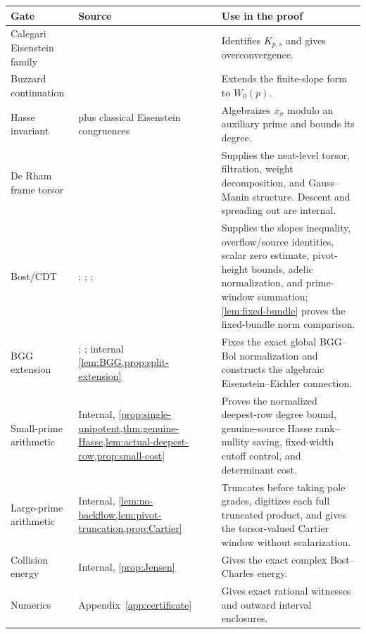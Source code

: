 \documentclass[11pt]{article}
\theoremstyle{definition}
\theoremstyle{remark}
\begin{document}
\begingroup\small
\begin{longtable}{@{}>{\raggedright\arraybackslash}p{}>{\raggedright\arraybackslash}p{}>{\raggedright\arraybackslash}p{}@{}}
\toprule
Gate & Source & Use in the proof\\
\midrule
Calegari Eisenstein family & \cite[Theorem~2.3 and Lemma~2.4]{Calegari2005}
& Identifies $K_{p,s}$ and gives overconvergence.\\
Buzzard continuation & \cite[Theorem~5.2]{Buzzard2003}
& Extends the finite-slope form to $W_0(p)$.\\
Hasse invariant & \cite{Katz1973} plus classical Eisenstein congruences
& Algebraizes $x_\sigma$ modulo an auxiliary prime and bounds its degree.\\
De Rham frame torsor & \cite[Propositions~A.14--A.15]{GPRJ2025}
& Supplies the neat-level torsor, filtration, weight decomposition, and
Gauss--Manin structure.  Descent and spreading out are internal.\\
Bost/CDT & \cite{Bost2001};
\cite[Theorem~5.4.1 and Proposition~5.4.2]{BostCharles2022};
\cite[Theorem~3.2.13 and (7.3.7), (7.3.14)--(7.3.16)]{CDT2024};
\cite[Theorem~2.6]{CDT2025}
& Supplies the slopes inequality, overflow/source identities, scalar zero
estimate, pivot-height bounds, adelic normalization, and prime-window
summation; \cref{lem:fixed-bundle} proves the fixed-bundle norm comparison.\\
BGG extension & \cite[Proposition~2.4.3]{RodriguezCamargo2023};
\cite[Proposition~2.4.1 and Remark~2.4.2]{Urban2013}; internal
\cref{lem:BGG,prop:split-extension}
& Fixes the exact global BGG--Bol normalization and constructs the algebraic
Eisenstein--Eichler connection.\\
Small-prime arithmetic & Internal,
\cref{prop:single-unipotent,thm:genuine-Hasse,lem:actual-deepest-row,prop:small-cost}
& Proves the normalized deepest-row degree bound, genuine-source Hasse
rank--nullity saving, fixed-width cutoff control, and determinant cost.\\
Large-prime arithmetic & Internal,
\cref{lem:no-backflow,lem:pivot-truncation,prop:Cartier}
& Truncates before taking pole grades, digitizes each full truncated product,
and gives the torsor-valued Cartier window without scalarization.\\
Collision energy & Internal, \cref{prop:Jensen}
& Gives the exact complex Bost--Charles energy.\\
Numerics & Appendix~\ref{app:certificate}
& Gives exact rational witnesses and outward interval enclosures.\\
\bottomrule
\end{longtable}
\endgroup
\end{document}
